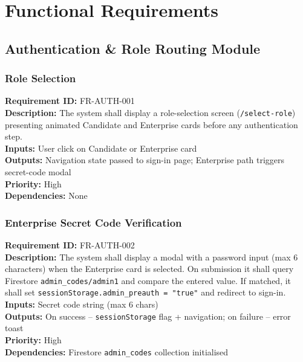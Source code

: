 \documentclass{fisatinternship}
\begin{document}
\chapter{Functional Requirements}

\section{Authentication \& Role Routing Module}

\subsection{Role Selection}
\textbf{Requirement ID:} FR-AUTH-001\\
\textbf{Description:} The system shall display a role-selection screen (\texttt{/select-role})
presenting animated Candidate and Enterprise cards before any authentication step.\\
\textbf{Inputs:} User click on Candidate or Enterprise card\\
\textbf{Outputs:} Navigation state passed to sign-in page; Enterprise path triggers secret-code modal\\
\textbf{Priority:} High\\
\textbf{Dependencies:} None

\vspace{0.4cm}

\subsection{Enterprise Secret Code Verification}
\textbf{Requirement ID:} FR-AUTH-002\\
\textbf{Description:} The system shall display a modal with a password input (max 6 characters)
when the Enterprise card is selected. On submission it shall query Firestore
\texttt{admin\_codes/admin1} and compare the entered value. If matched, it shall set
\texttt{sessionStorage.admin\_preauth = "true"} and redirect to sign-in.\\
\textbf{Inputs:} Secret code string (max 6 chars)\\
\textbf{Outputs:} On success -- \texttt{sessionStorage} flag + navigation; on failure -- error toast\\
\textbf{Priority:} High\\
\textbf{Dependencies:} Firestore \texttt{admin\_codes} collection initialised

\vspace{0.4cm}
\end{document}
